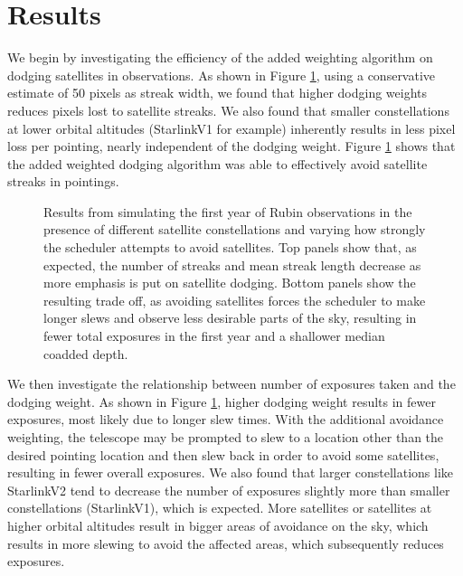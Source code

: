 \documentclass[linenumbers]{aastex631}
\begin{document}
\section{Results}
We begin by investigating the efficiency of the added weighting algorithm on dodging
satellites in observations. As shown in Figure \ref{fig-pixel-loss-weight}, using a conservative estimate of 50 pixels as
streak width, we found that higher dodging weights reduces pixels lost to satellite streaks. We
also found that smaller constellations at lower orbital altitudes (StarlinkV1 for example)
inherently results in less pixel loss per pointing, nearly independent of the dodging weight.
Figure \ref{fig-pixel-loss-weight} shows that the added weighted dodging algorithm was able to effectively avoid satellite streaks in pointings.

\begin{figure}[ht!]
\caption{Results from simulating the first year of Rubin observations in the presence of different satellite constellations and varying how strongly the scheduler attempts to avoid satellites.  Top panels show that, as expected, the number of streaks and mean streak length decrease as more emphasis is put on satellite dodging. Bottom panels show the resulting trade off, as avoiding satellites forces the scheduler to make longer slews and observe less desirable parts of the sky, resulting in fewer total exposures in the first year and a shallower median coadded depth. \label{fig-pixel-loss-weight}}
\end{figure}

We then investigate the relationship between number of exposures taken and the dodging
weight. As shown in Figure \ref{fig-pixel-loss-weight}, higher dodging weight results in fewer exposures, most likely due
to longer slew times. With the additional avoidance weighting, the telescope may be prompted to
slew to a location other than the desired pointing location and then slew back in order to avoid
some satellites, resulting in fewer overall exposures. We also found that larger constellations like
StarlinkV2 tend to decrease the number of exposures slightly more than smaller constellations
(StarlinkV1), which is expected. More satellites or satellites at higher orbital altitudes result in
bigger areas of avoidance on the sky, which results in more slewing to avoid the affected areas,
which subsequently reduces exposures. \\
\end{document}
